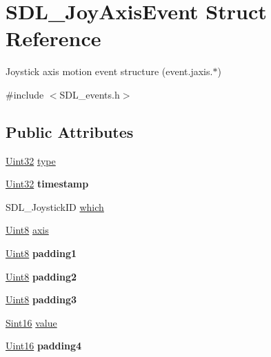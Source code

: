 \hypertarget{struct_s_d_l___joy_axis_event}{}\section{S\+D\+L\+\_\+\+Joy\+Axis\+Event Struct Reference}
\label{struct_s_d_l___joy_axis_event}


Joystick axis motion event structure (event.\+jaxis.$\ast$)  




{\ttfamily \#include $<$S\+D\+L\+\_\+events.\+h$>$}

\subsection*{Public Attributes}
\begin{DoxyCompactItemize}
\item 
\hyperlink{_s_d_l__stdinc_8h_add440eff171ea5f55cb00c4a9ab8672d}{Uint32} \hyperlink{struct_s_d_l___joy_axis_event_aed1c873fb90ba58194e65f972933c67d}{type}
\item 
\mbox{\label{struct_s_d_l___joy_axis_event_a60ecfc70df9eeef8e33b5dd7dc060389}} 
\hyperlink{_s_d_l__stdinc_8h_add440eff171ea5f55cb00c4a9ab8672d}{Uint32} {\bfseries timestamp}
\item 
S\+D\+L\+\_\+\+Joystick\+ID \hyperlink{struct_s_d_l___joy_axis_event_a965719f4703a7091bcc5f07f79fcf7e1}{which}
\item 
\hyperlink{_s_d_l__stdinc_8h_a2944638813a090aa23e62f4da842c3e2}{Uint8} \hyperlink{struct_s_d_l___joy_axis_event_a0beac2fb161e45771c424bd0b6daeabb}{axis}
\item 
\mbox{\label{struct_s_d_l___joy_axis_event_ae8e17bced478530638982f0382a0dafa}} 
\hyperlink{_s_d_l__stdinc_8h_a2944638813a090aa23e62f4da842c3e2}{Uint8} {\bfseries padding1}
\item 
\mbox{\label{struct_s_d_l___joy_axis_event_ad5407250032f618fde7437ac5f229257}} 
\hyperlink{_s_d_l__stdinc_8h_a2944638813a090aa23e62f4da842c3e2}{Uint8} {\bfseries padding2}
\item 
\mbox{\label{struct_s_d_l___joy_axis_event_a8bf5144fddc19686c2003add1f0e1565}} 
\hyperlink{_s_d_l__stdinc_8h_a2944638813a090aa23e62f4da842c3e2}{Uint8} {\bfseries padding3}
\item 
\hyperlink{_s_d_l__stdinc_8h_a9d0257032c0e146ab6121bf0122712f5}{Sint16} \hyperlink{struct_s_d_l___joy_axis_event_a53ee73e7c367934dd6edb69963be5556}{value}
\item 
\mbox{\label{struct_s_d_l___joy_axis_event_a604b258940a8cd8beaa5efeb55d6f825}} 
\hyperlink{_s_d_l__stdinc_8h_a31fcc0a076c9068668173ee26d33e42b}{Uint16} {\bfseries padding4}
\end{DoxyCompactItemize}


